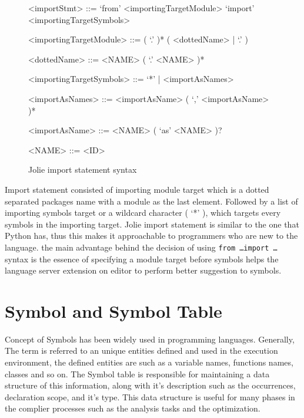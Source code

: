 \begin{figure}[ht]
    \begin{framed}
        \begin{grammar}
            <importStmt>
            ::= `from' <importingTargetModule> `import' <importingTargetSymbols>

            <importingTargetModule> ::= ( `.' )* ( <dottedName> | `.' )

            <dottedName>
            ::= <NAME> ( `.' <NAME> )*

            <importingTargetSymbols> ::=  `*' | <importAsNames>

            <importAsNames>
            ::= <importAsName> ( `,' <importAsName> )*

            <importAsName>
            ::= <NAME> ( `as' <NAME> )?

            <NAME> ::= <ID>
        \end{grammar}
    \end{framed}
    \caption{Jolie import statement syntax }
    \label{fig:jolie-import-stmt-syntax}
\end{figure}

Import statement consisted of importing module target which is a dotted separated packages name with a module as the last element. Followed by a list of importing symbols target or a wildcard character ( `*' ), which targets every symbols in the importing target.
Jolie import statement is similar to the one that Python has, thus this makes it approachable to programmers who are new to the language.
the main advantage behind the decision of using \texttt{from \dots import \dots} syntax is the essence of specifying a module target before symbols helps the language server extension on editor to perform better suggestion to symbols.

\section{Symbol and Symbol Table}

Concept of Symbols has been widely used in programming languages. Generally, The term is referred to an unique entities defined and used in the execution environment, the defined entities are such as a variable names, functions names, classes and so on.
The Symbol table is responsible for maintaining a data structure of this information, along with it's description such as the occurrences, declaration scope, and it's type. This data structure is useful for many phases in the complier processes such as the analysis tasks and the optimization.


